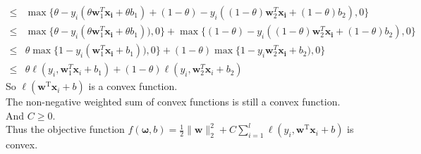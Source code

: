 \documentclass[a4paper]{article}
\begin{document}
\begin{enumerate}
\begin{enumerate}
\begin{equation*}
\begin{aligned}
      \leq &\max \{\theta-y_i (\theta \boldsymbol{w}_{1}^{T}\boldsymbol{x_i}+\theta b_{1}) + (1-\theta)-y_i ((1-\theta) \boldsymbol{w}_{2}^{T}\boldsymbol{x_i} +(1-\theta) b_{2}), 0\}\\
      \leq &\max \{\theta-y_i (\theta \boldsymbol{w}_{1}^{T}\boldsymbol{x_i}+\theta b_{1}) ), 0\} + \max \{(1-\theta)-y_i ((1-\theta) \boldsymbol{w}_{2}^{T}\boldsymbol{x_i} +(1-\theta) b_{2}), 0\}\\
      \leq &\theta \max \{1-y_i (\boldsymbol{w}_{1}^{T}\boldsymbol{x_i}+b_{1}) ), 0\} + (1-\theta)\max \{1-y_i \boldsymbol{w}_{2}^{T}\boldsymbol{x_i} +b_{2}), 0\}\\ 
      \leq &\theta \ell \left(y_i, \boldsymbol{w}_{1}^{T} \boldsymbol{x}_{i}+b_{1}\right)+(1-\theta) \ell \left(y_i, \boldsymbol{w}_{2}^{T} \boldsymbol{x}_{i}+b_{2}\right)
    \end{aligned}
  \end{equation*}
  So $\ell(\boldsymbol{w}^{\mathrm{T}} \boldsymbol{x}_{i}+b)$ is a convex function.\\
  The non-negative weighted sum of convex functions is still a convex function. And $C \geq 0$. \\
  Thus the objective function $f(\boldsymbol{\omega} ,b) = \frac{1}{2}\|\boldsymbol{w}\|_{2}^{2}+C \sum_{i=1}^{l} \ell\left(y_{i}, \boldsymbol{w}^{\mathrm{T}} \boldsymbol{x}_{i}+b\right)$ is convex.
\end{enumerate}

\end{enumerate}
  
  
  
\end{document}
